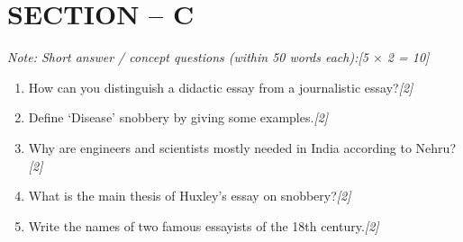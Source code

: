 \documentclass[11pt,a4paper]{article}
\newcommand{\pts}[1]{\hfill \textit{[#1]}}
\begin{document}
\bigskip

\section*{SECTION -- C}
\noindent \textit{Note: Short answer / concept questions (within 50 words each):}\pts{5 $\times$ 2 = 10}

\begin{enumerate}[label=\textbf{\arabic*.},leftmargin=*,start=8,itemsep=6pt]

  \item How can you distinguish a didactic essay from a journalistic essay?\pts{2}
  \item Define `Disease' snobbery by giving some examples.\pts{2}
  \item Why are engineers and scientists mostly needed in India according to Nehru?\pts{2}
  \item What is the main thesis of Huxley's essay on snobbery?\pts{2}
  \item Write the names of two famous essayists of the 18th century.\pts{2}

\end{enumerate}
\end{document}
